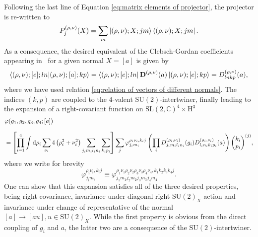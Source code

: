 \documentclass[11pt,a4paper]{article}
\newcommand{\C}{\mathbb C}
\newcommand{\SU}{\text{SU$(2)$}}
\newcommand{\SL}{\text{SL$(2,\C)$}}
\newcommand{\HH}{\text{H}^3}
\begin{document}
Following the last line of Equation \eqref{eq:matrix elements of projector}, the projector is re-written to
%
\begin{equation}
P_j^{(\rho,\nu)}(X)
=
\sum_m \ket{(\rho,\nu);X;jm}\bra{(\rho,\nu);X;jm}.
\end{equation}
%
As a consequence, the desired equivalent of the Clebsch-Gordan coefficients appearing in~\cite{Baratin:2011tx} for a given normal $X = [a]$ is given by
%
\begin{equation}
\braket{(\rho,\nu);[e];ln}{(\rho,\nu);[a];kp}
=
\bra{(\rho,\nu);[e];ln}\mathbf{D}^{(\rho,\nu)}(a)\ket{(\rho,\nu);[e];kp}
=
D^{(\rho,\nu)}_{lnkp}(a),
\end{equation} 
%
where we have used relation \eqref{eq:relation of vectors of different normals}. The indices $(k,p)$ are coupled to the $4$-valent $\SU$-intertwiner, finally leading to the expansion of a right-covariant function on $\SL^4\times\HH$
%
\begin{equation}\label{eq:group field with right covariance}
\begin{aligned}
& \varphi(g_1, g_2, g_3, g_4;[a])\\[7pt]
& =
\left[\prod_{i=1}^4\int\dd{\rho_i}\sum_{\nu_i}4\left(\rho_i^2+\nu_i^2\right)\sum_{j_i m_i l_i n_i}\sum_{k_i p_i}\right]\sum_{j}\varphi^{\rho_i\nu_i,k_i j}_{j_i m_i}\left(\prod_i D^{(\rho_i,\nu_i)}_{j_i m_i l_i n_i}(g_i)D^{(\rho_i,\nu_i)}_{l_i n_i k_i p_i}(a)\right)\mqty(k_i \\ p_i)^{(j)},
\end{aligned}
\end{equation}
%
where we write for brevity
%
\begin{equation}
\varphi^{\rho_i\nu_i,k_i j}_{j_i m_i}
\equiv
\varphi^{\rho_1\nu_1\rho_2\nu_2\rho_3\nu_3\rho_4\nu_4,k_1 k_2 k_3 k_4 j}_{j_1 m_1 j_2 m_2 j_3 m_3 j_4 m_4}.
\end{equation}
One can show that this expansion satisfies all of the three desired properties, being right-covariance, invariance under diagonal right $\SU_X$ action and invariance under change of representative of the normal $[a] \rightarrow [au], u\in\SU_X$. While the first property is obvious from the direct coupling of $g_i$ and $a$, the latter two are a consequence of the $\SU$-intertwiner.



\end{document}
